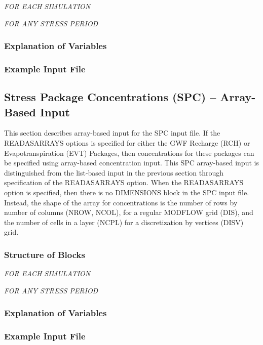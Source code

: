 \noindent \textit{FOR EACH SIMULATION}


\vspace{5mm}
\noindent \textit{FOR ANY STRESS PERIOD}


\vspace{5mm}
\subsubsection{Explanation of Variables}
\begin{description}

\end{description}

\subsubsection{Example Input File}


\newpage
\subsection{Stress Package Concentrations (SPC) -- Array-Based Input}

This section describes array-based input for the SPC input file.  If the READASARRAYS options is specified for either the GWF Recharge (RCH) or Evapotranspiration (EVT) Packages, then concentrations for these packages can be specified using array-based concentration input.  This SPC array-based input is distinguished from the list-based input in the previous section through specification of the READASARRAYS option.  When the READASARRAYS option is specified, then there is no DIMENSIONS block in the SPC input file.  Instead, the shape of the array for concentrations is the number of rows by number of columns (NROW, NCOL), for a regular MODFLOW grid (DIS), and the number of cells in a layer (NCPL) for a discretization by vertices (DISV) grid.

\vspace{5mm}
\subsubsection{Structure of Blocks}
\vspace{5mm}

\noindent \textit{FOR EACH SIMULATION}

\vspace{5mm}
\noindent \textit{FOR ANY STRESS PERIOD}


\vspace{5mm}
\subsubsection{Explanation of Variables}
\begin{description}

\end{description}

\subsubsection{Example Input File}



